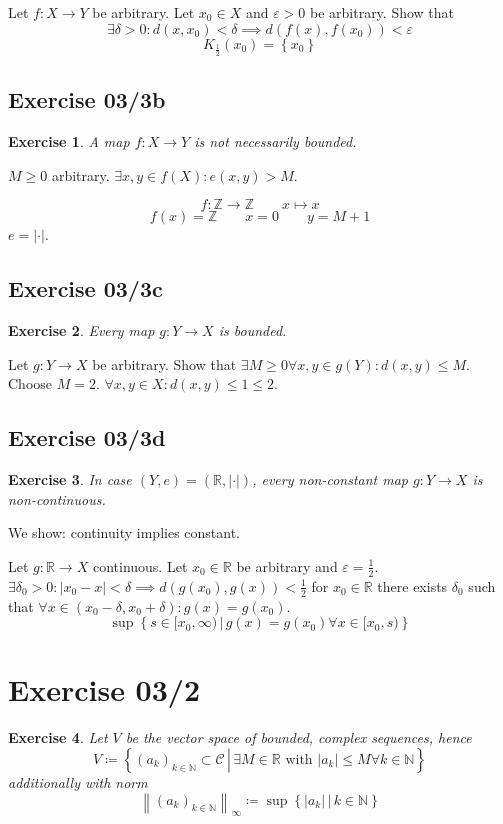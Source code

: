 \documentclass{article}
\newtheorem{ex}{Exercise} %
\newcommand{\set}[1]{\left\{#1\right\}}
\newcommand{\setdef}[2]{\left\{\left.#1\,\right|\,#2\right\}}
\newcommand{\norm}[1]{\left\|#1\right\|}
\newcommand{\card}[1]{\left|#1\right|}
\begin{document}
Let $f: X \to Y$ be arbitrary.
Let $x_0 \in X$ and $\varepsilon > 0$ be arbitrary.
Show that
\[ \exists \delta > 0: d(x, x_0) < \delta \implies d(f(x), f(x_0)) < \varepsilon \]
\[ K_{\frac12}(x_0) = \set{x_0} \]

\subsection{Exercise 03/3b}
\begin{ex}
  A map $f: X \to Y$ is not necessarily bounded.
\end{ex}

$M \geq 0$ arbitrary. $\exists x,y \in f(X): e(x,y) > M$.

\[ f: \mathbb Z \to \mathbb Z \qquad x \mapsto x \]
\[ f(x) = \mathbb Z \qquad x = 0 \qquad y = M + 1 \]
$e = \card{\cdot}$.

\subsection{Exercise 03/3c}
\begin{ex}
  Every map $g: Y \to X$ is bounded.
\end{ex}
Let $g: Y \to X$ be arbitrary.
Show that $\exists M \geq 0 \forall x,y \in g(Y): d(x,y) \leq M$.
Choose $M = 2$. $\forall x,y \in X: d(x,y) \leq 1 \leq 2$.

\subsection{Exercise 03/3d}
\begin{ex}
  In case $(Y, e) = (\mathbb R, \card{\cdot})$, every non-constant map $g: Y \to X$ is non-continuous.
\end{ex}

We show: continuity implies constant.

Let $g: \mathbb R \to X$ continuous.
Let $x_0 \in \mathbb R$ be arbitrary and $\varepsilon = \frac12$.
$\exists \delta_0 > 0: \card{x_0 - x} < \delta \implies d(g(x_0), g(x)) < \frac12$
for $x_0 \in \mathbb R$ there exists $\delta_0$ such that 
$\forall x \in (x_0 - \delta, x_0 + \delta): g(x) = g(x_0)$.
\[ \operatorname{sup}\setdef{s \in [x_0, \infty)}{g(x) = g(x_0) \forall x \in [x_0, s)} \]

\section{Exercise 03/2}
\begin{ex}
  Let $V$ be the vector space of bounded, complex sequences, hence
  \[
    V \coloneqq \setdef{(a_k)_{k \in \mathbb N} \subset \mathcal C}{\exists M \in \mathbb R \text{ with } \card{a_k} \leq M \forall k \in \mathbb N}
  \]
  additionally with norm
  \[ \norm{(a_k)_{k \in \mathbb N}}_{\infty} \coloneqq \sup\setdef{\card{a_k}}{k \in \mathbb N} \]
\end{ex}
\end{document}

